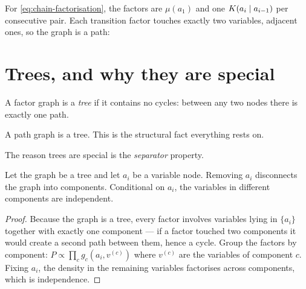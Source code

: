 For \eqref{eq:chain-factorisation}, the factors are $\mu(a_1)$ and one
$K(a_i\mid a_{i-1})$ per consecutive pair. Each transition factor touches exactly two
variables, adjacent ones, so the graph is a path:

\begin{center}
\end{center}

\section{Trees, and why they are special}

\begin{definition}
A factor graph is a \emph{tree} if it contains no cycles: between any two nodes there is
exactly one path.
\end{definition}

A path graph is a tree. This is the structural fact everything rests on.

The reason trees are special is the \emph{separator} property.

\begin{proposition}[Separation]
\label{prop:separator}
Let the graph be a tree and let $a_i$ be a variable node. Removing $a_i$ disconnects the graph
into components. Conditional on $a_i$, the variables in different components are independent.
\end{proposition}

\begin{proof}
Because the graph is a tree, every factor involves variables lying in $\{a_i\}$ together with
exactly one component --- if a factor touched two components it would create a second path
between them, hence a cycle. Group the factors by component:
$P \propto \prod_{c} g_c\!\left(a_i, v^{(c)}\right)$ where $v^{(c)}$ are the variables of
component $c$. Fixing $a_i$, the density in the remaining variables factorises across
components, which is independence.
\end{proof}

